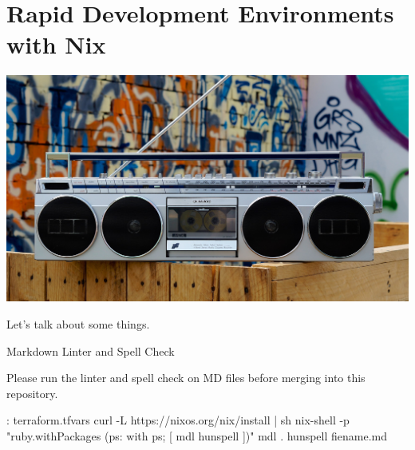 \chapter{Rapid Development Environments with Nix}

\includegraphics[scale=0.85]{../images/boombox-5693150_1920.jpg}

Let's talk about some things.

Markdown Linter and Spell Check

Please run the linter and spell check on MD files before merging into this
repository.

\begin{mybox}{\thetcbcounter: terraform.tfvars}
curl -L https://nixos.org/nix/install | sh
nix-shell -p "ruby.withPackages (ps: with ps; [ mdl hunspell ])"
mdl .
hunspell fiename.md
\end{mybox}
